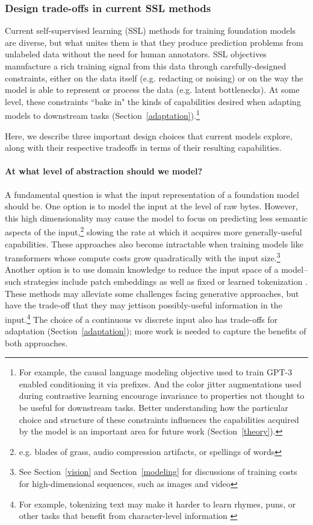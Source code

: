 \subsubsection{Design trade-offs in current SSL methods} Current self-supervised learning (SSL) methods for training foundation models are diverse, but what unites them is that they produce prediction problems from unlabeled data without the need for human annotators. SSL objectives manufacture a rich training signal from this data through carefully-designed constraints, either on the data itself (e.g. redacting or noising) or on the way the model is able to represent or process the data (e.g. latent bottlenecks). At some level, these constraints ``bake in" the kinds of capabilities desired when adapting models to downstream tasks (Section~\ref{adaptation}).\footnote{For example, the causal language modeling objective used to train GPT-3 \citep{brown2020gpt3} enabled conditioning it via prefixes. And the color jitter augmentations used during contrastive learning \citep{chen2020simclr} encourage invariance to properties not thought to be useful for downstream tasks. Better understanding how the particular choice and structure of these constraints influences the capabilities acquired by the model is an important area for future work (Section~\ref{theory}).}

Here, we describe three important design choices that current models explore, along with their respective tradeoffs in terms of their resulting capabilities.

\paragraph{At what level of abstraction should we model?} A fundamental question is what the input representation of a foundation model should be. One option is to model the input at the level of raw bytes. However, this high dimensionality may cause the model to focus on predicting less semantic aspects of the  input,\footnote{e.g. blades of grass, audio compression artifacts, or spellings of words} slowing the rate at which it acquires more generally-useful capabilities. These approaches also become intractable when training models like transformers \citep{vaswani2017attention} whose compute costs grow quadratically with the input size.\footnote{See Section~\ref{vision} and Section~\ref{modeling} for discussions of training costs for high-dimensional sequences, such as images and video} Another option is to use domain knowledge to reduce the input space of a model--such strategies include patch embeddings \citep{visual_transformer} as well as fixed or learned tokenization \citep{Schuster2012JapaneseAK, Sennrich2016NeuralMT, Kudo2018SentencePieceAS, Oord2017NeuralDR, ramesh2021zeroshot}. These methods may alleviate some challenges facing generative approaches, but have the trade-off that they may jettison possibly-useful information in the input.\footnote{For example, tokenizing text may make it harder to learn rhymes, puns, or other tasks that benefit from character-level information \citep{branwen2020gpt}} The choice of a continuous vs discrete input also has trade-offs for adaptation (Section~\ref{adaptation}); more work is needed to capture the benefits of both approaches.

